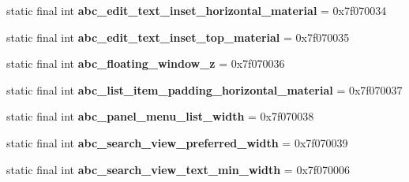 \begin{DoxyCompactItemize}
\item 
\hypertarget{classandroid_1_1support_1_1design_1_1_r_1_1dimen_aedd7d9d99b8c4f081a9582ae33e056c4}{}static final int {\bfseries abc\+\_\+edit\+\_\+text\+\_\+inset\+\_\+horizontal\+\_\+material} = 0x7f070034\label{classandroid_1_1support_1_1design_1_1_r_1_1dimen_aedd7d9d99b8c4f081a9582ae33e056c4}

\item 
\hypertarget{classandroid_1_1support_1_1design_1_1_r_1_1dimen_ac9ec7c237aed1411b8bf85d1f2de801b}{}static final int {\bfseries abc\+\_\+edit\+\_\+text\+\_\+inset\+\_\+top\+\_\+material} = 0x7f070035\label{classandroid_1_1support_1_1design_1_1_r_1_1dimen_ac9ec7c237aed1411b8bf85d1f2de801b}

\item 
\hypertarget{classandroid_1_1support_1_1design_1_1_r_1_1dimen_a7c730cc453da03509011d0f75524689a}{}static final int {\bfseries abc\+\_\+floating\+\_\+window\+\_\+z} = 0x7f070036\label{classandroid_1_1support_1_1design_1_1_r_1_1dimen_a7c730cc453da03509011d0f75524689a}

\item 
\hypertarget{classandroid_1_1support_1_1design_1_1_r_1_1dimen_a2876e7547b2e4660135953655f79ff25}{}static final int {\bfseries abc\+\_\+list\+\_\+item\+\_\+padding\+\_\+horizontal\+\_\+material} = 0x7f070037\label{classandroid_1_1support_1_1design_1_1_r_1_1dimen_a2876e7547b2e4660135953655f79ff25}

\item 
\hypertarget{classandroid_1_1support_1_1design_1_1_r_1_1dimen_a365e3bc959933ee12d8b935ea42253de}{}static final int {\bfseries abc\+\_\+panel\+\_\+menu\+\_\+list\+\_\+width} = 0x7f070038\label{classandroid_1_1support_1_1design_1_1_r_1_1dimen_a365e3bc959933ee12d8b935ea42253de}

\item 
\hypertarget{classandroid_1_1support_1_1design_1_1_r_1_1dimen_a6901ca34b7cc25c725a55d9973e6c0c5}{}static final int {\bfseries abc\+\_\+search\+\_\+view\+\_\+preferred\+\_\+width} = 0x7f070039\label{classandroid_1_1support_1_1design_1_1_r_1_1dimen_a6901ca34b7cc25c725a55d9973e6c0c5}

\item 
\hypertarget{classandroid_1_1support_1_1design_1_1_r_1_1dimen_a986b8c7dc11c0933e28f3f72ed50578e}{}static final int {\bfseries abc\+\_\+search\+\_\+view\+\_\+text\+\_\+min\+\_\+width} = 0x7f070006\label{classandroid_1_1support_1_1design_1_1_r_1_1dimen_a986b8c7dc11c0933e28f3f72ed50578e}


\end{DoxyCompactItemize}

